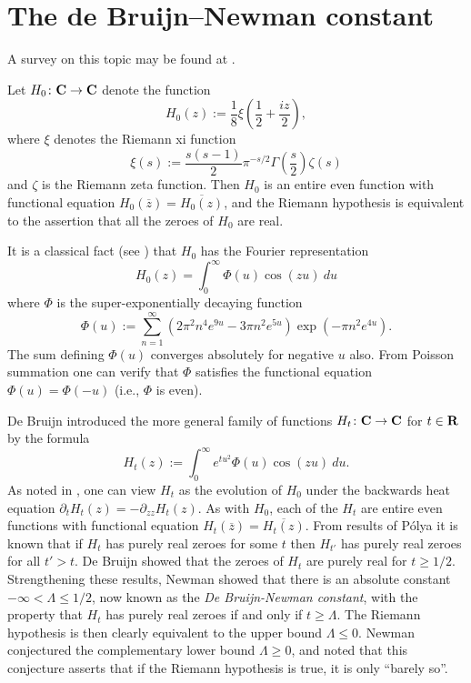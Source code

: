 \chapter{The de Bruijn--Newman constant}\label{debruijn-newman-chapter}

A survey on this topic may be found at \cite{newman-wu-survey}.

Let $H_0 \colon \mathbf{C} \to \mathbf{C}$ denote the function
\begin{equation}\label{hoz}
 H_0(z) := \frac{1}{8} \xi\left(\frac{1}{2} + \frac{iz}{2}\right),
\end{equation}
where $\xi$ denotes the Riemann xi function
\begin{equation}\label{sas}
 \xi(s) := \frac{s(s-1)}{2} \pi^{-s/2} \Gamma\left(\frac{s}{2}\right) \zeta(s)
\end{equation}
and $\zeta$ is the Riemann zeta function.
Then $H_0$ is an entire even function with functional equation $H_0(\overline{z}) = \overline{H_0(z)}$, and the Riemann hypothesis is equivalent to the assertion that all the zeroes of $H_0$ are real.

It is a classical fact (see \cite[p. 255]{titchmarsh_theory_1986}) that $H_0$ has the Fourier representation
$$ H_0(z) = \int_0^\infty \Phi(u) \cos(zu)\ du$$
where $\Phi$ is the super-exponentially decaying function
\begin{equation}\label{phidef}
 \Phi(u) := \sum_{n=1}^\infty (2\pi^2  n^4 e^{9u} - 3\pi n^2 e^{5u} ) \exp(-\pi n^2 e^{4u} ).
\end{equation}
The sum defining $\Phi(u)$ converges absolutely for negative $u$ also.  From Poisson summation one can verify that $\Phi$ satisfies the functional equation $\Phi(u) = \Phi(-u)$ (i.e., $\Phi$ is even).

De Bruijn \cite{debr} introduced the more general family of functions $H_t \colon \mathbf{C} \to \mathbf{C}$ for $t \in \mathbf{R}$ by the formula
\begin{equation}\label{htdef}
 H_t(z) := \int_0^\infty e^{tu^2} \Phi(u) \cos(zu)\ du.
\end{equation}
As noted in \cite[p.114]{csv}, one can view $H_t$ as the evolution of $H_0$ under the backwards heat equation $\partial_t H_t(z)= -\partial_{zz} H_t(z)$.
As with $H_0$, each of the $H_t$ are entire even functions with functional equation $H_t(\overline{z}) = \overline{H_t(z)}$.  From results of P\'olya \cite{polya} it is known that if $H_t$ has purely real zeroes for some $t$ then $H_{t'}$ has purely real zeroes for all $t'>t$.
De Bruijn showed that the zeroes of $H_t$ are purely real for $t \geq 1/2$.  Strengthening these results, Newman \cite{newman} showed that there is an absolute constant $-\infty < \Lambda \leq 1/2$, now known as the \emph{De Bruijn-Newman constant}, with the property that $H_t$ has purely real zeroes if and only if $t \geq \Lambda$.  The Riemann hypothesis is then clearly equivalent to the upper bound $\Lambda \leq 0$.  Newman conjectured the complementary lower bound $\Lambda \geq 0$, and noted that this conjecture asserts that if the Riemann hypothesis is true, it is only ``barely so''.

